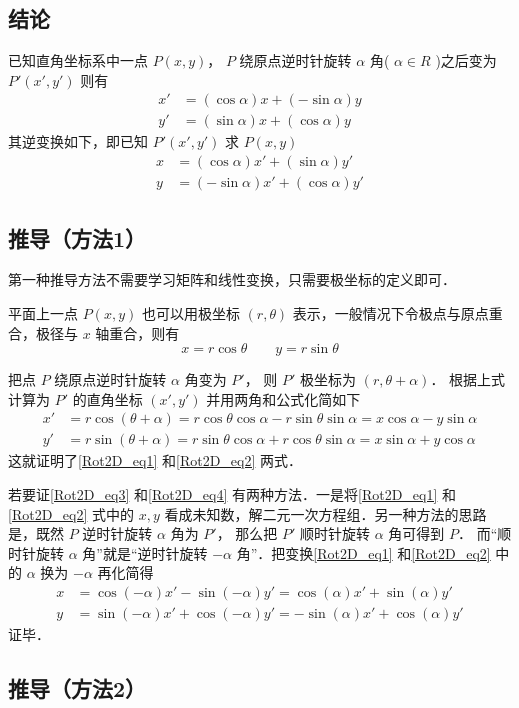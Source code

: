 \subsection{结论}
已知直角坐标系中一点 $P(x,y)$， $P$ 绕原点逆时针旋转 $\alpha $ 角( $\alpha  \in R$ )之后变为 $P'(x',y')$ 则有
\begin{align}\label{Rot2D_eq1}
x' &= (\cos \alpha)x + (- \sin \alpha)y \\
\label{Rot2D_eq2}
y' &= (\sin \alpha)x + (\cos \alpha)y
\end{align}
其逆变换如下，即已知 $P'(x',y')$ 求 $P(x,y)$ 
\begin{align}\label{Rot2D_eq3}
x &= ( \cos \alpha  )x' + ( \sin \alpha  )y' \\
\label{Rot2D_eq4}
y &= (  - \sin \alpha  )x' + ( \cos \alpha )y'
\end{align}

\subsection{推导（方法1）}

第一种推导方法不需要学习矩阵和线性变换，只需要极坐标的定义即可．

平面上一点 $P( {x,y} )$ 也可以用极坐标 $( {r,\theta } )$ 表示，一般情况下令极点与原点重合，极径与 $x$ 轴重合，则有
\begin{equation}
x = r\cos \theta \qquad y = r\sin \theta 
\end{equation}     

把点 $P$ 绕原点逆时针旋转 $\alpha $ 角变为 $P'$， 则 $P'$ 极坐标为 $( {r,\theta  + \alpha } )$． 根据上式计算为 $P'$ 的直角坐标 $( {x',y'} )$ 并用两角和公式化简如下
\begin{align}
x' &= r\cos ( {\theta  + \alpha } ) = r\cos \theta \cos \alpha  - r\sin \theta \sin \alpha  = x\cos \alpha  - y\sin \alpha \\
y' &= r\sin ( {\theta  + \alpha } ) = r\sin \theta \cos \alpha  + r\cos \theta \sin \alpha  = x\sin \alpha  + y\cos \alpha 
\end{align} 
这就证明了\autoref{Rot2D_eq1} 和\autoref{Rot2D_eq2} 两式．

若要证\autoref{Rot2D_eq3} 和\autoref{Rot2D_eq4} 有两种方法．一是将\autoref{Rot2D_eq1} 和\autoref{Rot2D_eq2} 式中的 $x, y$ 看成未知数，解二元一次方程组．另一种方法的思路是，既然 $P$ 逆时针旋转 $\alpha $ 角为 $P'$， 那么把 $P'$ 顺时针旋转 $\alpha $ 角可得到 $P$． 而“顺时针旋转 $\alpha $ 角”就是“逆时针旋转 $ - \alpha $ 角”．把变换\autoref{Rot2D_eq1} 和\autoref{Rot2D_eq2} 中的 $\alpha $ 换为 $ - \alpha $ 再化简得
 \begin{align}
x &= \cos ( { - \alpha } )x' - \sin ( { - \alpha } )y' = \cos ( \alpha  )x' + \sin ( \alpha  )y'\\
y &= \sin(-\alpha)x' + \cos(- \alpha)y' =  -\sin(\alpha)x' + \cos(\alpha)y'
\end{align}
证毕．

\subsection{推导（方法2）}
